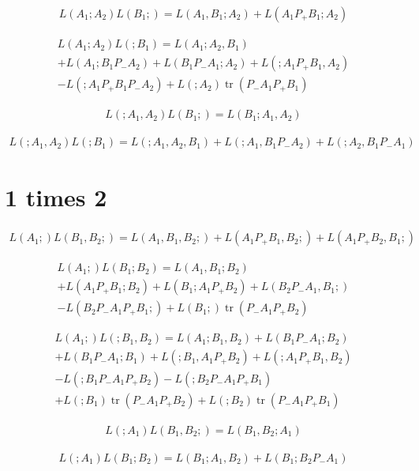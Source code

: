 \documentclass[b5paper,draft,openbib,12pt]{memoir}
\DeclareMathOperator{\tr}{tr}
\begin{document}
\begin{multline}
L(A_1;A_2)L(B_1;)=L(A_1,B_1;A_2) + L(A_1P_+B_1;A_2)
\end{multline}

\begin{multline}
L(A_1;A_2)L(;B_1) = L(A_1;A_2,B_1) \\
+L(A_1;B_1P_-A_2) + L(B_1P_-A_1;A_2) + L(;A_1P_+B_1,A_2)\\
-L(;A_1P_+B_1P_-A_2) + L(;A_2) \tr(P_-A_1P_+B_1)
\end{multline}

\begin{multline}
L(;A_1,A_2)L(B_1;) = L(B_1;A_1,A_2)
\end{multline}

\begin{multline}
L(;A_1,A_2)L(;B_1)=L(;A_1,A_2,B_1) + L(;A_1,B_1P_-A_2) + L(;A_2,B_1P_-A_1)
\end{multline}

\section{1 times 2}
\begin{multline}
L(A_1;)L(B_1,B_2;)= L(A_1,B_1,B_2;) + L(A_1P_+B_1,B_2;) + L(A_1P_+B_2,B_1;)
\end{multline}

\begin{multline}
L(A_1;)L(B_1;B_2)=L(A_1,B_1;B_2) \\
+L(A_1P_+B_1;B_2) + L(B_1;A_1P_+B_2) + L(B_2P_-A_1,B_1;)\\
-L(B_2P_-A_1P_+B_1;) + L(B_1;)\tr(P_-A_1P_+B_2)
\end{multline}

\begin{multline}
L(A_1;)L(;B_1,B_2)=L(A_1;B_1,B_2) + L(B_1P_-A_1;B_2) \\
+L(B_1P_-A_1;B_1) + L(;B_1,A_1P_+B_2) + L(;A_1P_+B_1,B_2)\\
-L(;B_1P_-A_1P_+B_2) - L(;B_2P_-A_1P_+B_1)\\
+L(;B_1)\tr(P_-A_1P_+B_2) + L(;B_2) \tr(P_-A_1P_+B_1)
\end{multline}

\begin{multline}
L(;A_1)L(B_1,B_2;)=L(B_1,B_2;A_1)
\end{multline}

\begin{multline}
L(;A_1)L(B_1;B_2)=L(B_1;A_1,B_2) + L(B_1;B_2P_-A_1)
\end{multline}
\end{document}
